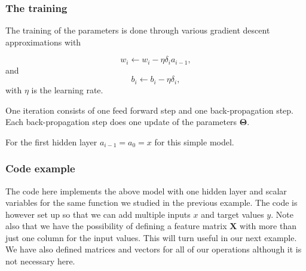 \documentclass{beamer}
\begin{document}
\begin{frame}
\frametitle{The training}

The training of the parameters is done through various gradient descent approximations with

\[
w_{i}\leftarrow w_{i}- \eta \delta_i a_{i-1},
\]
and
\[
b_i \leftarrow b_i-\eta \delta_i,
\]
with $\eta$ is the learning rate.

One iteration consists of one feed forward step and one back-propagation step. Each back-propagation step does one update of the parameters $\bm{\Theta}$.

For the first hidden layer $a_{i-1}=a_0=x$ for this simple model.
\end{frame}

\begin{frame}
\frametitle{Code example}

The code here implements the above model with one hidden layer and
scalar variables for the same function we studied in the previous
example.  The code is however set up so that we can add multiple
inputs $x$ and target values $y$. Note also that we have the
possibility of defining a feature matrix $\bm{X}$ with more than just
one column for the input values. This will turn useful in our next example. We have also defined matrices and vectors for all of our operations although it is not necessary here.



































































\end{frame}
\end{document}
